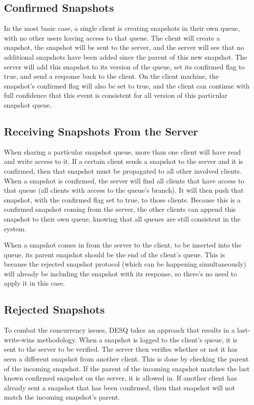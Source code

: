 \subsection{Confirmed Snapshots}

In the most basic case, a single client is creating snapshots in their own queue, with no other users having access to that queue. The client will create a snapshot, the snapshot will be sent to the server, and the server will see that no additional snapshots have been added since the parent of this new snapshot. The server will add this snapshot to its version of the queue, set its confirmed flag to true, and send a response back to the client. On the client machine, the snapshot's confirmed flag will also be set to true, and the client can continue with full confidence that this event is consistent for all version of this particular snapshot queue.

\subsection{Receiving Snapshots From the Server}

When sharing a particular snapshot queue, more than one client will have read and write access to it. If a certain client sends a snapshot to the server and it is confirmed, then that snapshot must be propagated to all other involved clients. When a snapshot is confirmed, the server will find all clients that have access to that queue (all clients with access to the queue's branch). It will then push that snapshot, with the confirmed flag set to true, to those clients. Because this is a confirmed snapshot coming from the server, the other clients can append this snapshot to their own queue, knowing that all queues are still consistent in the system.

When a snapshot comes in from the server to the client, to be inserted into the queue, its parent snapshot should be the end of the client's queue. This is because the rejected snapshot protocol (which can be happening simultaneously) will already be including the snapshot with its response, so there's no need to apply it in this case. 

\subsection{Rejected Snapshots}

To combat the concurrency issues, DESQ takes an approach that results in a last-write-wins methodology. When a snapshot is logged to the client’s queue, it is sent to the server to be verified. The server then verifies whether or not it has seen a different snapshot from another client. This is done by checking the parent of the incoming snapshot. If the parent of the incoming snapshot matches the last known confirmed snapshot on the server, it is allowed in. If another client has already sent a snapshot that has been confirmed, then that snapshot will not match the incoming snapshot's parent.

